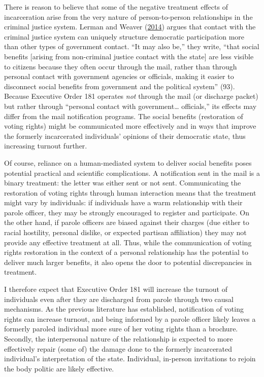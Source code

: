 \documentclass[
  12pt,
]{article}
\begin{document}
There is reason to believe that some of the negative treatment effects of incarceration arise from the very nature of person-to-person relationships in the criminal justice system. Lerman and Weaver (\protect\hyperlink{ref-Lerman2014}{2014}) argues that contact with the criminal justice system can uniquely structure democratic participation more than other types of government contact. ``It may also be,'' they write, ``that social benefits {[}arising from non-criminal justice contact with the state{]} are less visible to citizens because they often occur through the mail, rather than through personal contact with government agencies or officials, making it easier to disconnect social benefits from government and the political system'' (93). Because Executive Order 181 operates \emph{not} through the mail (or discharge packet) but rather through ``personal contact with government\ldots{} officials,'' its effects may differ from the mail notification programs. The social benefits (restoration of voting rights) might be communicated more effectively and in ways that improve the formerly incarcerated individuals' opinions of their democratic state, thus increasing turnout further.

Of course, reliance on a human-mediated system to deliver social benefits poses potential practical and scientific complications. A notification sent in the mail is a binary treatment: the letter was either sent or not sent. Communicating the restoration of voting rights through human interaction means that the treatment might vary by individuals: if individuals have a warm relationship with their parole officer, they may be strongly encouraged to register and participate. On the other hand, if parole officers are biased against their charges (due either to racial hostility, personal dislike, or expected partisan affiliation) they may not provide any effective treatment at all. Thus, while the communication of voting rights restoration in the context of a personal relationship has the potential to deliver much larger benefits, it also opens the door to potential discrepancies in treatment.

I therefore expect that Executive Order 181 will increase the turnout of individuals even after they are discharged from parole through two causal mechanisms. As the previous literature has established, notification of voting rights can increase turnout, and being informed by a parole officer likely leaves a formerly paroled individual more sure of her voting rights than a brochure. Secondly, the interpersonal nature of the relationship is expected to more effectively repair (some of) the damage done to the formerly incarcerated individual's interpretation of the state. Individual, in-person invitations to rejoin the body politic are likely effective.
\end{document}
